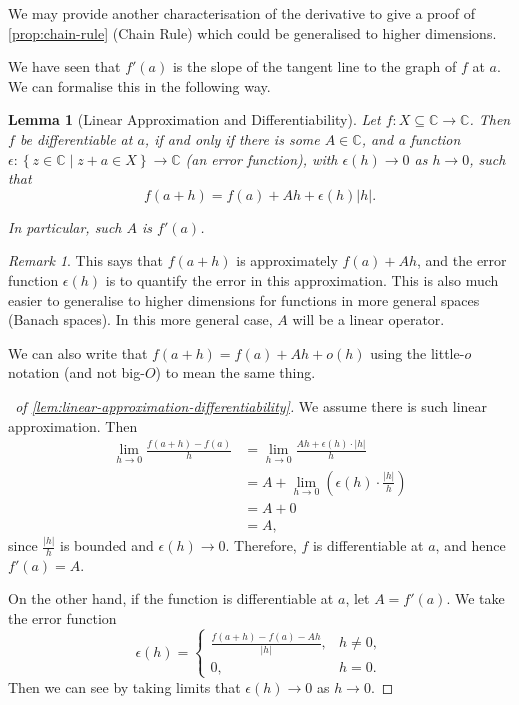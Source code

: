 \documentclass[11pt]{article}
\numberwithin{equation}{section}
\newtheorem{lemma}[theorem]{Lemma}
\theoremstyle{definition}
\theoremstyle{remark}
\newtheorem{remark}[theorem]{Remark}
\newcommand{\pqty}[1]{\left(#1\right)}
\newcommand{\abs}[1]{\left|#1\right|}
\newcommand{\set}[2]{\left\{#1\mid #2\right\}}
\newcommand{\functiondomain}[3]{#1:#2\to #3}
\newcommand{\CC}{\mathbb C}
\newcommand{\bigO}{O}
\newcommand{\littleO}{o}
\begin{document}
We may provide another characterisation of the derivative to give a proof of \autoref{prop:chain-rule} (Chain Rule) which could be generalised to higher dimensions.

We have seen that \(f'\pqty{a}\) is the slope of the tangent line to the graph of \(f\) at \(a\). We can formalise this in the following way.

\begin{lemma}[Linear Approximation and Differentiability]\label{analysis-unit-0108}
    \label{lem:linear-approximation-differentiability}%
    Let \(\functiondomain{f}{X \subseteq \CC}{\CC}\). Then \(f\) be differentiable at \(a\), if and only if there is some \(A \in \CC\), and a function \(\functiondomain{\epsilon}{\set{z \in \CC}{z + a \in X}}{\CC}\) (an error function), with \(\epsilon\pqty{h} \to 0\) as \(h \to 0\), such that
    \[
        f\pqty{a + h} = f\pqty{a} + A h + \epsilon\pqty{h} \abs{h}.
    \]

    In particular, such \(A\) is \(f'\pqty{a}\).
\end{lemma}

\begin{remark}\label{analysis-unit-0109}
    This says that \(f\pqty{a + h}\) is approximately \(f\pqty{a} + Ah\), and the error function \(\epsilon\pqty{h}\) is to quantify the error in this approximation. This is also much easier to generalise to higher dimensions for functions in more general spaces (Banach spaces). In this more general case, \(A\) will be a linear operator.
\end{remark}

We can also write that \(f\pqty{a + h} = f\pqty{a} + Ah + \littleO\pqty{h}\) using the little-\(\littleO\) notation (and not big-\(\bigO\)) to mean the same thing.

\begin{proof}[\proofname\ of \autoref{lem:linear-approximation-differentiability}]
    We assume there is such linear approximation. Then
    \begin{align*}
        \lim_{h \to 0} \frac{f\pqty{a + h} - f\pqty{a}}{h} &= \lim_{h \to 0} \frac{Ah + \epsilon\pqty{h} \cdot \abs{h}}{h} \\
        &= A + \lim_{h \to 0} \pqty{\epsilon\pqty{h} \cdot \frac{\abs{h}}{h}} \\
        &= A + 0 \\
        &= A,
    \end{align*}
    since \(\frac{\abs{h}}{h}\) is bounded and \(\epsilon\pqty{h} \to 0\). Therefore, \(f\) is differentiable at \(a\), and hence \(f'\pqty{a} = A\).

    On the other hand, if the function is differentiable at \(a\), let \(A = f'\pqty{a}\). We take the error function
    \[
        \epsilon\pqty{h} = \begin{cases}
            \frac{f\pqty{a + h} - f\pqty{a} - Ah}{\abs{h}}, & h \neq 0, \\
            0, & h = 0.
        \end{cases}
    \]
    Then we can see by taking limits that \(\epsilon\pqty{h} \to 0\) as \(h \to 0\).
\end{proof}
\end{document}
